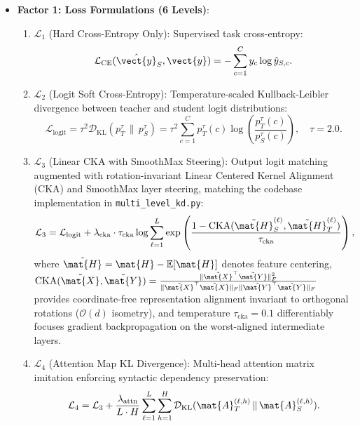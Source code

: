 \begin{itemize}
    \item \textbf{Factor 1: Loss Formulations (6 Levels)}:
    \begin{enumerate}
        \item $\mathcal{L}_1$ (Hard Cross-Entropy Only): Supervised task cross-entropy:
        \begin{equation}
        \mathcal{L}_{\text{CE}}(\hat{\vect{y}}_S, \vect{y}) = -\sum_{c=1}^C y_c \log \hat{y}_{S,c}.
        \end{equation}
        \item $\mathcal{L}_2$ (Logit Soft Cross-Entropy): Temperature-scaled Kullback-Leibler divergence between teacher and student logit distributions:
        \begin{equation}
        \mathcal{L}_{\text{logit}} = \tau^2 \mathcal{D}_{\text{KL}}(p_T^\tau \,\|\, p_S^\tau) = \tau^2 \sum_{c=1}^C p_T^\tau(c) \log\left(\frac{p_T^\tau(c)}{p_S^\tau(c)}\right), \quad \tau = 2.0.
        \end{equation}
        \item $\mathcal{L}_3$ (Linear CKA with SmoothMax Steering): Output logit matching augmented with rotation-invariant Linear Centered Kernel Alignment (CKA) and SmoothMax layer steering, matching the codebase implementation in \texttt{multi\_level\_kd.py}:
        \begin{equation}
        \mathcal{L}_3 = \mathcal{L}_{\text{logit}} + \lambda_{\text{cka}} \cdot \tau_{\text{cka}} \log \sum_{\ell=1}^L \exp\left(\frac{1 - \operatorname{CKA}(\tilde{\mat{H}}_S^{(\ell)}, \tilde{\mat{H}}_T^{(\ell)})}{\tau_{\text{cka}}}\right),
        \end{equation}
        where $\tilde{\mat{H}} = \mat{H} - \mathbb{E}[\mat{H}]$ denotes feature centering, $\operatorname{CKA}(\tilde{\mat{X}}, \tilde{\mat{Y}}) = \frac{\|\tilde{\mat{X}}^\top \tilde{\mat{Y}}\|_F^2}{\|\tilde{\mat{X}}^\top \tilde{\mat{X}}\|_F \|\tilde{\mat{Y}}^\top \tilde{\mat{Y}}\|_F}$ provides coordinate-free representation alignment invariant to orthogonal rotations ($\mathcal{O}(d)$ isometry), and temperature $\tau_{\text{cka}} = 0.1$ differentiably focuses gradient backpropagation on the worst-aligned intermediate layers.
        \item $\mathcal{L}_4$ (Attention Map KL Divergence): Multi-head attention matrix imitation enforcing syntactic dependency preservation:
        \begin{equation}
        \mathcal{L}_4 = \mathcal{L}_3 + \frac{\lambda_{\text{attn}}}{L \cdot H} \sum_{\ell=1}^L \sum_{h=1}^H \mathcal{D}_{\text{KL}}(\mat{A}_T^{(\ell, h)} \,\|\, \mat{A}_S^{(\ell, h)}).

\end{equation}
\end{enumerate}
\end{itemize}
